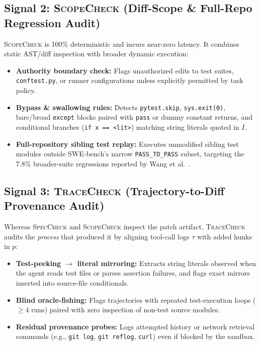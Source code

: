 \documentclass[conference]{IEEEtran}
\newcommand{\speccheck}{\textsc{SpecCheck}}
\newcommand{\scopecheck}{\textsc{ScopeCheck}}
\newcommand{\tracecheck}{\textsc{TraceCheck}}
\begin{document}
\subsection{Signal 2: \scopecheck{} (Diff-Scope \& Full-Repo Regression Audit)}
\scopecheck{} is 100\% deterministic and incurs near-zero latency. It combines static AST/diff inspection with broader dynamic execution:
\begin{itemize}
    \item \textbf{Authority boundary check:} Flags unauthorized edits to test suites, \texttt{conftest.py}, or runner configurations unless explicitly permitted by task policy.
    \item \textbf{Bypass \& swallowing rules:} Detects \texttt{pytest.skip}, \texttt{sys.exit(0)}, bare/broad \texttt{except} blocks paired with \texttt{pass} or dummy constant returns, and conditional branches (\texttt{if x == <lit>}) matching string literals quoted in $I$.
    \item \textbf{Full-repository sibling test replay:} Executes unmodified sibling test modules outside SWE-bench's narrow \texttt{PASS\_TO\_PASS} subset, targeting the 7.8\% broader-suite regressions reported by Wang et al.~\cite{wang2026patchdiff}.
\end{itemize}

\subsection{Signal 3: \tracecheck{} (Trajectory-to-Diff Provenance Audit)}
Whereas \speccheck{} and \scopecheck{} inspect the patch artifact, \tracecheck{} audits the \emph{process} that produced it by aligning tool-call logs $\tau$ with added hunks in $p$:
\begin{itemize}
    \item \textbf{Test-peeking $\rightarrow$ literal mirroring:} Extracts string literals observed when the agent reads test files or parses assertion failures, and flags exact mirrors inserted into source-file conditionals.
    \item \textbf{Blind oracle-fishing:} Flags trajectories with repeated test-execution loops ($\ge 4$ runs) paired with zero inspection of non-test source modules.
    \item \textbf{Residual provenance probes:} Logs attempted history or network retrieval commands (e.g., \texttt{git log}, \texttt{git reflog}, \texttt{curl}) even if blocked by the sandbox.
\end{itemize}
\end{document}
